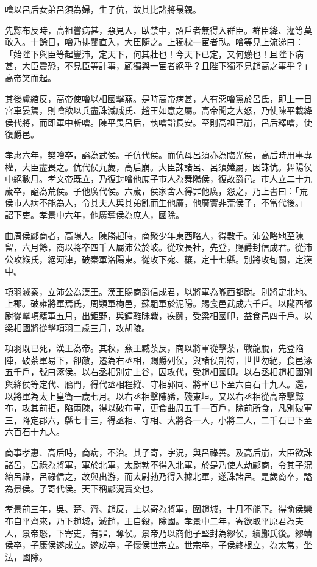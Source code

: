\begin{pinyinscope}
噲以呂后女弟呂須為婦，生子伉，故其比諸將最親。

先黥布反時，高祖嘗病甚，惡見人，臥禁中，詔戶者無得入群臣。群臣絳、灌等莫敢入。十餘日，噲乃排闥直入，大臣隨之。上獨枕一宦者臥。噲等見上流涕曰：「始陛下與臣等起豐沛，定天下，何其壯也！今天下已定，又何憊也！且陛下病甚，大臣震恐，不見臣等計事，顧獨與一宦者絕乎？且陛下獨不見趙高之事乎？」高帝笑而起。

其後盧綰反，高帝使噲以相國擊燕。是時高帝病甚，人有惡噲黨於呂氏，即上一日宮車晏駕，則噲欲以兵盡誅滅戚氏、趙王如意之屬。高帝聞之大怒，乃使陳平載絳侯代將，而即軍中斬噲。陳平畏呂后，執噲詣長安。至則高祖已崩，呂后釋噲，使復爵邑。

孝惠六年，樊噲卒，謚為武侯。子伉代侯。而伉母呂須亦為臨光侯，高后時用事專權，大臣盡畏之。伉代侯九歲，高后崩。大臣誅諸呂、呂須婘屬，因誅伉。舞陽侯中絕數月。孝文帝既立，乃復封噲他庶子市人為舞陽侯，復故爵邑。市人立二十九歲卒，謚為荒侯。子他廣代侯。六歲，侯家舍人得罪他廣，怨之，乃上書曰：「荒侯市人病不能為人，令其夫人與其弟亂而生他廣，他廣實非荒侯子，不當代後。」詔下吏。孝景中六年，他廣奪侯為庶人，國除。

曲周侯酈商者，高陽人。陳勝起時，商聚少年東西略人，得數千。沛公略地至陳留，六月餘，商以將卒四千人屬沛公於岐。從攻長社，先登，賜爵封信成君。從沛公攻緱氏，絕河津，破秦軍洛陽東。從攻下宛、穰，定十七縣。別將攻旬關，定漢中。

項羽滅秦，立沛公為漢王。漢王賜商爵信成君，以將軍為隴西都尉。別將定北地、上郡。破雍將軍焉氏，周類軍栒邑，蘇駔軍於泥陽。賜食邑武成六千戶。以隴西都尉從擊項籍軍五月，出鉅野，與鐘離眛戰，疾鬬，受梁相國印，益食邑四千戶。以梁相國將從擊項羽二歲三月，攻胡陵。

項羽既已死，漢王為帝。其秋，燕王臧荼反，商以將軍從擊荼，戰龍脫，先登陷陣，破荼軍易下，卻敵，遷為右丞相，賜爵列侯，與諸侯剖符，世世勿絕，食邑涿五千戶，號曰涿侯。以右丞相別定上谷，因攻代，受趙相國印。以右丞相趙相國別與絳侯等定代、鴈門，得代丞相程縱、守相郭同、將軍已下至六百石十九人。還，以將軍為太上皇衛一歲七月。以右丞相擊陳豨，殘東垣。又以右丞相從高帝擊黥布，攻其前拒，陷兩陳，得以破布軍，更食曲周五千一百戶，除前所食，凡別破軍三，降定郡六，縣七十三，得丞相、守相、大將各一人，小將二人，二千石已下至六百石十九人。

商事孝惠、高后時，商病，不治。其子寄，字況，與呂祿善。及高后崩，大臣欲誅諸呂，呂祿為將軍，軍於北軍，太尉勃不得入北軍，於是乃使人劫酈商，令其子況紿呂祿，呂祿信之，故與出游，而太尉勃乃得入據北軍，遂誅諸呂。是歲商卒，謚為景侯。子寄代侯。天下稱酈況賣交也。

孝景前三年，吳、楚、齊、趙反，上以寄為將軍，圍趙城，十月不能下。得俞侯欒布自平齊來，乃下趙城，滅趙，王自殺，除國。孝景中二年，寄欲取平原君為夫人，景帝怒，下寄吏，有罪，奪侯。景帝乃以商他子堅封為繆侯，續酈氏後。繆靖侯卒，子康侯遂成立。遂成卒，子懷侯世宗立。世宗卒，子侯終根立，為太常，坐法，國除。


\end{pinyinscope}
